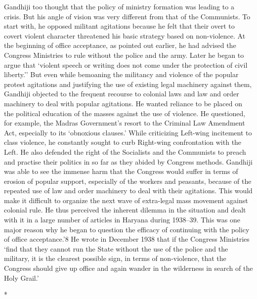 \begin{multicols}{2}
Gandhiji too thought that the policy of ministry formation was leading to a crisis. But his angle of vision was very different from that of the Communists. To start with, he opposed militant agitations because he felt that their overt to covert violent character threatened his basic strategy based on non-violence. At the beginning of office acceptance, as pointed out earlier, he had advised the Congress Ministries to rule without the police and the army. Later he began to argue that `violent speech or writing does not come under the protection of civil liberty.'' But even while bemoaning the militancy and violence of the popular protest agitations and justifying the use of existing legal machinery against them, Gandhiji objected to the frequent recourse to colonial laws and law and order machinery to deal with popular agitations. He wanted reliance to be placed on the political education of the masses against the use of violence. He questioned, for example, the Madras Government's resort to the Criminal Law Amendment Act, especially to its `obnoxious clauses.' While criticizing Left-wing incitement to class violence, he constantly sought to curb Right-wing confrontation with the Left. He also defended the right of the Socialists and the Communists to preach and practise their politics in so far as they abided by Congress methods. Gandhiji was able to see the immense harm that the Congress would suffer in terms of erosion of popular support, especially of the workers and peasants, because of the repeated use of law and order machinery to deal with their agitations. This would make it difficult to organize the next wave of extra-legal mass movement against colonial rule. He thus perceived the inherent dilemma in the situation and dealt with it in a large number of articles in Haryana during 1938--39. This was one major reason why he began to question the efficacy of continuing with the policy of office acceptance.'8 He wrote in December 1938 that if the Congress Ministries `find that they cannot run the State without the use of the police and the military, it is the clearest possible sign, in terms of non-violence, that the Congress should give up office and again wander in the wilderness in search of the Holy Grail.'

\begin{center}*\end{center}

\paragraph*{}


\end{multicols}
